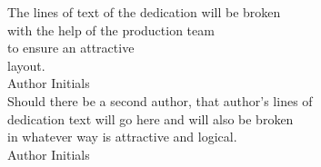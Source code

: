 \thispagestyle{empty}
\begin{center}The lines of text of the dedication will be broken\\ 
with the help of the production team\\ 
to ensure an attractive\\
layout.\\[1ex] 
Author Initials\\
\vspace*{3pc}
Should there be a second author, that author's lines of\\  %
dedication text will go here and will also be broken\\        %
in whatever way is attractive and logical.\\[1ex]                %
Author Initials\\
\end{center}